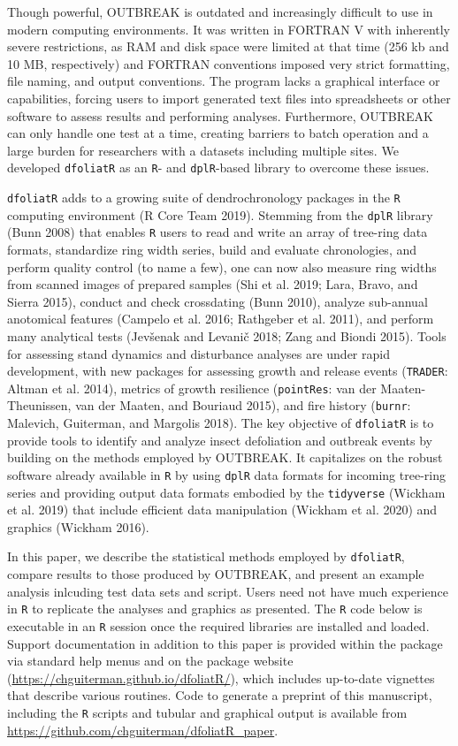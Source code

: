 \documentclass[review]{elsarticle} %
\begin{document}
Though powerful, OUTBREAK is outdated and increasingly difficult to use in modern computing environments. It was written in FORTRAN V with inherently severe restrictions, as RAM and disk space were limited at that time (256 kb and 10 MB, respectively) and FORTRAN conventions imposed very strict formatting, file naming, and output conventions. The program lacks a graphical interface or capabilities, forcing users to import generated text files into spreadsheets or other software to assess results and performing analyses. Furthermore, OUTBREAK can only handle one test at a time, creating barriers to batch operation and a large burden for researchers with a datasets including multiple sites. We developed \texttt{dfoliatR} as an \texttt{R}- and \texttt{dplR}-based library to overcome these issues.

\texttt{dfoliatR} adds to a growing suite of dendrochronology packages in the \texttt{R} computing environment (R Core Team 2019). Stemming from the \texttt{dplR} library (Bunn 2008) that enables \texttt{R} users to read and write an array of tree-ring data formats, standardize ring width series, build and evaluate chronologies, and perform quality control (to name a few), one can now also measure ring widths from scanned images of prepared samples (Shi et al. 2019; Lara, Bravo, and Sierra 2015), conduct and check crossdating (Bunn 2010), analyze sub-annual anotomical features (Campelo et al. 2016; Rathgeber et al. 2011), and perform many analytical tests (Jevšenak and Levanič 2018; Zang and Biondi 2015). Tools for assessing stand dynamics and disturbance analyses are under rapid development, with new packages for assessing growth and release events (\texttt{TRADER}: Altman et al. 2014), metrics of growth resilience (\texttt{pointRes}: van der Maaten-Theunissen, van der Maaten, and Bouriaud 2015), and fire history (\texttt{burnr}: Malevich, Guiterman, and Margolis 2018). The key objective of \texttt{dfoliatR} is to provide tools to identify and analyze insect defoliation and outbreak events by building on the methods employed by OUTBREAK. It capitalizes on the robust software already available in \texttt{R} by using \texttt{dplR} data formats for incoming tree-ring series and providing output data formats embodied by the \texttt{tidyverse} (Wickham et al. 2019) that include efficient data manipulation (Wickham et al. 2020) and graphics (Wickham 2016).

In this paper, we describe the statistical methods employed by \texttt{dfoliatR}, compare results to those produced by OUTBREAK, and present an example analysis inlcuding test data sets and script. Users need not have much experience in \texttt{R} to replicate the analyses and graphics as presented. The \texttt{R} code below is executable in an \texttt{R} session once the required libraries are installed and loaded. Support documentation in addition to this paper is provided within the package via standard help menus and on the package website (\url{https://chguiterman.github.io/dfoliatR/}), which includes up-to-date vignettes that describe various routines. Code to generate a preprint of this manuscript, including the \texttt{R} scripts and tubular and graphical output is available from \url{https://github.com/chguiterman/dfoliatR_paper}.
\end{document}
